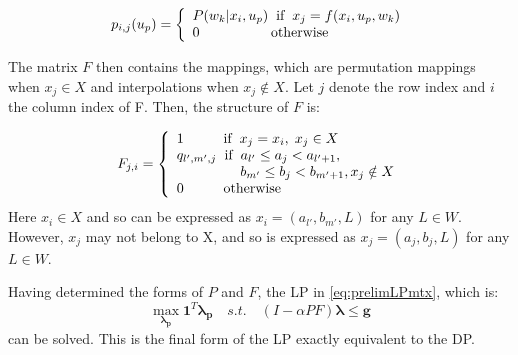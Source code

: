 \documentclass[conference]{IEEEtran}
\begin{document}
\begin{equation} \label{eq:TransProb}
p_{i,j}(u_{p})=
\left\{
\begin{array}{l}
P(w_{k}|x_{i},u_{p}) \hspace{0.2cm} \text{if} \hspace{0.2cm} x_{j}=f(x_{i},u_{p},w_{k})\\
0 \hspace{1.8cm} \text{otherwise}
\end{array}
\right.
\end{equation}

The matrix $F$ then contains the mappings, which are permutation mappings when $x_{j}\in X$ and interpolations when $x_{j}\not\in X$. Let $j$ denote the row index and $i$ the column index of F. Then, the structure of $F$ is:

\begin{displaymath}
F_{j,i}=
\left\{
\begin{array}{l}
1		   \hspace{1cm} \text{if} \hspace{0.2cm}x_{j}=x_{i}, \hspace{0.1cm}x_{j}\in X\\
q_{l',m',j}\hspace{0.2cm} \text{if} \hspace{0.2cm} a_{l'}\leq a_{j}< a_{l'+1},\\
\hspace{1.6cm} b_{m'}\leq b_{j}< b_{m'+1}, x_{j}\notin X\\
0		   \hspace{1cm} \text{otherwise}
\end{array}
\right.
\end{displaymath} Here $x_{i}\in X$ and so can be expressed as $x_{i}=(a_{l'},b_{m'},L)$ for any $L\in W$. However, $x_{j}$ may not belong to X, and so is expressed as $x_{j}=(a_{j},b_{j},L)$ for any $L\in W$.

Having determined the forms of $P$ and $F$, the LP in \eqref{eq:prelimLPmtx}, which is:
\begin{equation} \label{eq:LPfinal}
    \max_{\boldsymbol{\lambda_{p}}} \boldsymbol{1}^{T} \boldsymbol{\lambda_{p}}
    \hspace{1em}s.t.\hspace{1em}
    (I-\alpha PF)\boldsymbol{\lambda} \leq \boldsymbol{g}
\end{equation} can be solved. This is the final form of the LP exactly equivalent to the DP. 
\end{document}
